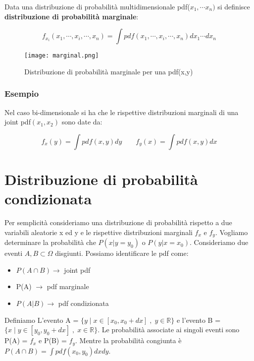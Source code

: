 Data una distribuzione di probabilit\`{a} multidimensionale pdf($x_1,\cdots x_n)$ si definisce \textbf{distribuzione di probabilit\`{a} marginale}:

\begin{equation}
	f_{x_i}(x_1, \cdots,x_{i},\cdots,x_n) = \int pdf(x_1,\cdots,x_i,\cdots,x_n)dx_1\cdots dx_n
\end{equation}

 
\begin{figure}[ht]
\vspace{0.in}
\texttt{[image: marginal.png]}	
\centering
\vspace{0.in}
\caption{Distribuzione di probabilit\`{a} marginale per una pdf(x,y)}
\end{figure}

\subsubsection{Esempio}

Nel caso bi-dimensionale si ha che le rispettive distribuzioni marginali di una joint pdf$(x_1,x_2)$ sono date da:

\begin{equation}
	f_x(y) = \int pdf(x,y)dy \quad  \quad f_y(x) = \int pdf(x,y)dx
\end{equation}


\section{Distribuzione di probabilit\`{a} condizionata}

Per semplicit\`{a} consideriamo una distribuzione di probabilit\`{a} rispetto a due variabili aleatorie x ed y e le rispettive distribuzioni marginali $f_x$ e $f_y$. Vogliamo determinare la  probabilit\`{a} che $P(x \vert y = y_0)$ o $P(y \vert x = x_0) $. Consideriamo due eventi $A,B \subset \Omega$ disgiunti. Possiamo identificare le pdf come:

\begin{itemize}
	\item $P(A \cap B) \rightarrow $ joint pdf
	\item P(A) $\rightarrow$ pdf marginale
	\item $P(A|B) \rightarrow $ pdf condizionata
\end{itemize}

\noindent Definiamo L'evento A = $\{ y \; \vert \; x \in [x_0,x_0 +dx]\;,\; y \in \mathbb{R} \} $ e l'evento B = $\{ x \; \vert \; y \in [y_0,y_0 +dx]\;,\; x \in \mathbb{R} \} $. Le probabilit\`{a} associate ai singoli eventi sono P(A) = $f_x$ e P(B) = $f_y$. Mentre la probabilit\`{a} congiunta \`{e} $P(A \cap B) = \int pdf(x_0,y_0)dxdy$. 

